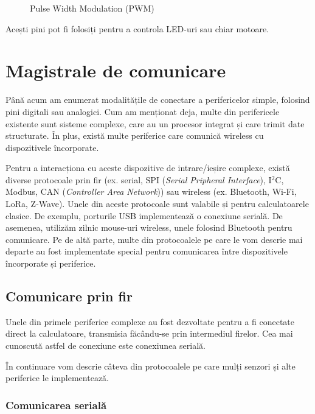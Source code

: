 \begin{figure}[htbp]
  \centering
  \def\svgwidth{\columnwidth}
  
  \caption{Pulse Width Modulation (PWM)}
  \label{fig:embed-pwm}
\end{figure}

Acești pini pot fi folosiți pentru a controla LED-uri sau chiar motoare.

\section{Magistrale de comunicare}
\label{sec:embed:bus}

Până acum am enumerat modalitățile de conectare a perifericelor simple, folosind pini digitali sau analogici.
Cum am menționat deja, multe din perifericele existente sunt sisteme complexe, care au un procesor integrat și care trimit date structurate.
În plus, există multe periferice care comunică wireless cu dispozitivele încorporate.

Pentru a interacționa cu aceste dispozitive de intrare/ieșire complexe, există diverse protocoale prin fir (ex. serial, SPI (\textit{Serial Pripheral Interface}), I$^2$C, Modbus, CAN (\textit{Controller Area Network})) sau wireless (ex. Bluetooth, Wi-Fi, LoRa, Z-Wave).
Unele din aceste protocoale sunt valabile și pentru calculatoarele clasice.
De exemplu, porturile USB implementează o conexiune serială.
De asemenea, utilizăm zilnic mouse-uri wireless, unele folosind Bluetooth pentru comunicare.
Pe de altă parte, multe din protocoalele pe care le vom descrie mai departe au fost implementate special pentru comunicarea între dispozitivele încorporate și periferice.

\subsection{Comunicare prin fir}
\label{sec:embed:bus:wired}

Unele din primele periferice complexe au fost dezvoltate pentru a fi conectate direct la calculatoare, transmisia făcându-se prin intermediul firelor.
Cea mai cunoscută astfel de conexiune este conexiunea serială.

În continuare vom descrie câteva din protocoalele pe care mulți senzori și alte periferice le implementează.

\subsubsection{Comunicarea serială}
\label{sec:embed:bus:wired:serial}

